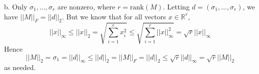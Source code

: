 \documentclass[11pt]{article}
\begin{document}
b.
Only $\sigma_1,\hdots, \sigma_r$ are nonzero, where $r = \text{rank}(M)$.
Letting $d = (\sigma_1,\hdots, \sigma_r)$, we have
$||M||_F = ||d||_2$.
But we know that for all vectors $x \in \mathbb{R}^r$,
\[
||x||_\infty \leq ||x||_2 = \sqrt{\sum_{i=1}^r x_i^2} \leq \sqrt{\sum_{i=1}^r ||x||_\infty^2} = \sqrt{r} ||x||_\infty
\]
Hence
\[
||M||_2 = \sigma_1 = ||d||_\infty \leq ||d||_2 = ||M||_F = ||d||_2 \leq \sqrt{r}||d||_\infty = \sqrt{r} ||M||_2  
\]
as needed.
\end{document}
